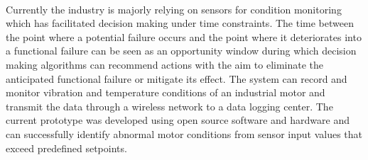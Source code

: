 \paragraph{}Currently the industry is majorly relying on sensors for condition monitoring which has facilitated decision making under time constraints.
The time between the point where a potential failure occurs and the point where it deteriorates into a functional failure can be seen as an opportunity window during which decision making algorithms can recommend actions with the aim to eliminate the anticipated functional failure or mitigate its effect. The system can record and monitor vibration and temperature conditions of an industrial motor and transmit the data through a wireless network to a data logging center. The current prototype was developed using open source software and hardware and can successfully identify abnormal motor conditions from sensor input values that exceed predefined setpoints.


